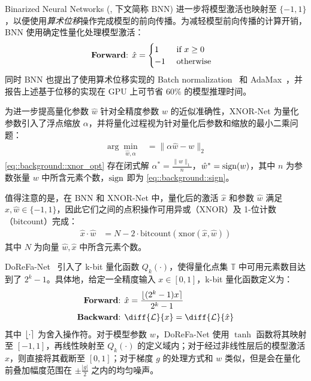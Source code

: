 Binarized Neural Networks (\citet{hubara2016binarized}, 下文简称 BNN) 进一步将模型激活也映射至 $\{-1, 1\}$，以便使用\emph{算术位移}操作完成模型的前向传播。为减轻模型前向传播的计算开销，BNN 使用确定性量化处理模型激活：
\begin{align}
  \text{\textbf{Forward}: } & \hat{x} = 
    \begin{cases} 
      1 & \text{ if } x \ge 0 \\
      -1 & \text{ otherwise}
    \end{cases}
    \label{eq::background::sign}
\end{align}
同时 BNN 也提出了使用算术位移实现的 Batch normalization~\citep{ioffe2015batch} 和 AdaMax~\citep{kingma2014adam}，并报告上述基于位移的实现在 GPU 上可节省 $60\%$ 的模型推理时间。

为进一步提高量化参数 $\hat{w}$ 针对全精度参数 $w$ 的近似准确性，XNOR-Net \citep{rastegari2016xnor} 为量化参数引入了浮点缩放 $\alpha$，并将量化过程视为针对量化后参数和缩放的最小二乘问题：
\begin{align}
\arg\min_{\hat{w}, \alpha} &= \| \alpha\hat{w} - w \|_2 \label{eq::background::xnor_opt}
\end{align}
\eqref{eq::background::xnor_opt} 存在闭式解 $\alpha^* = \frac{\|w\|_1}{n}$，$\hat{w}^* = \operatorname{sign}(w)$，其中 $n$ 为参数张量 $w$ 中所含元素个数，$\operatorname{sign}$ 即为 \eqref{eq::background::sign}。

值得注意的是，在 BNN 和 XNOR-Net 中，量化后的激活 $\hat{x}$ 和参数 $\hat{w}$ 满足 $\hat{x}, \hat{w} \in \{-1, 1\}$，因此它们之间的点积操作可用异或（XNOR）及 1-位计数（bitcount）完成：
\begin{align}
  \hat{x} \cdot \hat{w} &= N - 2 \cdot \mathrm{bitcount}(\mathrm{xnor}(\hat{x}, \hat{w})) \label{eq::background::xnor_dot}
\end{align}
其中 $N$ 为向量 $\hat{w}, \hat{x}$ 中所含元素个数。

DoReFa-Net~\citep{zhou2016dorefanet} 引入了 k-bit 量化函数 $Q_k(\cdot)$，使得量化点集 $\mathbb{T}$ 中可用元素数目达到了 $2^k-1$。具体地，给定一全精度输入 $x\in [0, 1]$，k-bit 量化函数定义为：
\begin{align}
  \text{\textbf{Forward}: } & \hat{x} = \frac{\lfloor (2^k - 1)x \rceil}{2^k - 1} \label{eq::background::dorefa_fwd} \\
  \text{\textbf{Backward}: } & \diff{\mathcal{L}}{x} = \diff{\mathcal{L}}{\hat{x}}
\end{align}
其中 $\left\lfloor \cdot \right\rceil$ 为舍入操作符。对于模型参数 $w$，DoReFa-Net 使用 $\tanh$ 函数将其映射至 $[-1, 1]$，再线性映射至 $Q_k(\cdot)$ 的定义域内；对于经过非线性层后的模型激活 $x$，则直接将其截断至 $[0, 1]$；对于梯度 $g$ 的处理方式和 $w$ 类似，但是会在量化前叠加幅度范围在 $\pm \frac{|g|}{2}$ 之内的均匀噪声。

